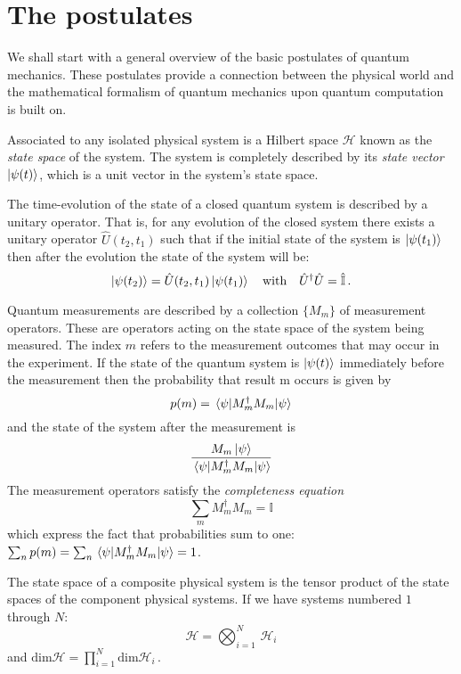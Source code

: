 \section{The postulates}
We shall start with a general overview of the basic postulates of quantum mechanics. These postulates provide a connection between the physical world and the mathematical formalism of quantum mechanics upon quantum computation is built on.
\begin{postulate}\label{postulate:1}
Associated to any isolated physical system is a Hilbert space $\mathcal{H}$ known as the \emph{state space} of the
system. The system is completely described by its \emph{state vector} $\ket{\psi(t)}$, which is a unit
vector in the system’s state space.
\end{postulate}
\begin{postulate}
The time-evolution of the state of a closed quantum system is described by a
unitary operator. That is, for any evolution of the closed system there exists
a unitary operator $\widehat{U}(t_2,t_1)$ such that if the initial state of the system is $\ket{\psi(t_1)}$ then
after the evolution the state of the system will be:
\begin{equation*}
    \ket{\psi(t_2)} = \hat{U}(t_2,t_1) \ket{\psi(t_1)} \quad \text{with} \quad \hat{U}^\dagger\hat{U} = \hat{\mathbb{I}}\,.
\end{equation*}
\end{postulate}
\begin{postulate}
Quantum measurements are described by a collection $\{M_m\}$ of
measurement operators. These are operators acting on the state space of the
system being measured. The index $m$ refers to the measurement outcomes that
may occur in the experiment. If the state of the quantum system is $\ket{\psi(t)}$
immediately before the measurement then the probability that result m occurs is given by
\begin{equation*}
    p(m) = \expval{M^\dagger_m M_m}{\psi}
\end{equation*}
and the state of the system after the measurement is
\begin{equation*}
    \frac{M_m\ket{\psi}}{\expval{M^\dagger_m M_m}{\psi}}
\end{equation*}
The measurement operators satisfy the \emph{completeness equation}
\begin{equation*}
    \sum_m M_m^\dagger M_m = \mathbb{I}
\end{equation*}
which express the fact that probabilities sum to one: $\sum_n p(m) = \sum_n \expval{M^\dagger_m M_m}{\psi} = 1$.
\end{postulate}
\begin{postulate}\label{postulate:4}
The state space of a composite physical system is the tensor product
of the state spaces of the component physical systems. If we have systems numbered $1$ through $N$:
\begin{equation*}
   \mathcal{H} = \bigotimes_{i=1}^{N}\,\mathcal{H}_i
\end{equation*}
and $\text{dim}\mathcal{H} = \prod_{i=1}^N \text{dim}\mathcal{H}_i$\,.
\end{postulate}